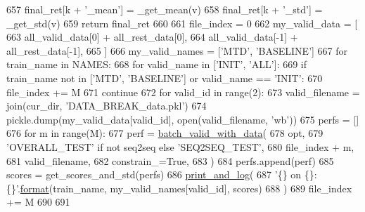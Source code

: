 \begin{DoxyCode}
657             final\_ret[k + \textcolor{stringliteral}{'\_mean'}] = \_get\_mean(v)
658             final\_ret[k + \textcolor{stringliteral}{'\_std'}] = \_get\_std(v)
659         \textcolor{keywordflow}{return} final\_ret
660 
661     file\_index = 0
662     my\_valid\_data = [
663         all\_valid\_data[0] + all\_rest\_data[0],
664         all\_valid\_data[-1] + all\_rest\_data[-1],
665     ]
666     my\_valid\_names = [\textcolor{stringliteral}{'MTD'}, \textcolor{stringliteral}{'BASELINE'}]
667     \textcolor{keywordflow}{for} train\_name \textcolor{keywordflow}{in} NAMES:
668         \textcolor{keywordflow}{for} valid\_name \textcolor{keywordflow}{in} [\textcolor{stringliteral}{'INIT'}, \textcolor{stringliteral}{'ALL'}]:
669             \textcolor{keywordflow}{if} train\_name \textcolor{keywordflow}{not} \textcolor{keywordflow}{in} [\textcolor{stringliteral}{'MTD'}, \textcolor{stringliteral}{'BASELINE'}] \textcolor{keywordflow}{or} valid\_name == \textcolor{stringliteral}{'INIT'}:
670                 file\_index += M
671                 \textcolor{keywordflow}{continue}
672             \textcolor{keywordflow}{for} valid\_id \textcolor{keywordflow}{in} range(2):
673                 valid\_filename = join(cur\_dir, \textcolor{stringliteral}{'DATA\_BREAK\_data.pkl'})
674                 pickle.dump(my\_valid\_data[valid\_id], open(valid\_filename, \textcolor{stringliteral}{'wb'}))
675                 perfs = []
676                 \textcolor{keywordflow}{for} m \textcolor{keywordflow}{in} range(M):
677                     perf = \hyperlink{namespaceprojects_1_1mastering__the__dungeon_1_1mturk_1_1tasks_1_1MTD_1_1run_af40bd2583024f251c70529d0d0863258}{batch\_valid\_with\_data}(
678                         opt,
679                         \textcolor{stringliteral}{'OVERALL\_TEST'} \textcolor{keywordflow}{if} \textcolor{keywordflow}{not} seq2seq \textcolor{keywordflow}{else} \textcolor{stringliteral}{'SEQ2SEQ\_TEST'},
680                         file\_index + m,
681                         valid\_filename,
682                         constrain\_=\textcolor{keyword}{True},
683                     )
684                     perfs.append(perf)
685                 scores = get\_scores\_and\_std(perfs)
686                 \hyperlink{namespaceprojects_1_1mastering__the__dungeon_1_1mturk_1_1tasks_1_1MTD_1_1run_acdf4e0fae33f363cf0b352a72788f9bd}{print\_and\_log}(
687                     \textcolor{stringliteral}{'\{\} on \{\}: \{\}'}.\hyperlink{namespaceparlai_1_1chat__service_1_1services_1_1messenger_1_1shared__utils_a32e2e2022b824fbaf80c747160b52a76}{format}(train\_name, my\_valid\_names[valid\_id], scores)
688                 )
689             file\_index += M
690 
691 
\end{DoxyCode}
